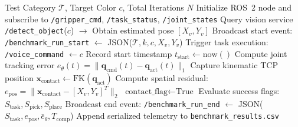 \documentclass[runningheads]{llncs}
\begin{document}
\begin{algorithm}[tb]
\caption{Automated Benchmark Execution and Telemetry Logging}
\label{alg:benchmark_workflow}
\begin{algorithmic}[1]
\REQUIRE Test Category $\mathcal{T}$, Target Color $c$, Total Iterations $N$
\STATE Initialize ROS~2 node and subscribe to \texttt{/gripper\_cmd}, \texttt{/task\_status}, \texttt{/joint\_states}
    \STATE Query vision service \texttt{/detect\_object}($c$) $\to$ Obtain estimated pose $[X_v, Y_v]$
    \STATE Broadcast start event: \texttt{/benchmark\_run\_start} $\leftarrow$ JSON($\mathcal{T}, k, c, X_v, Y_v$)
    \STATE Trigger task execution: \texttt{/voice\_command} $\leftarrow c$
    \STATE Record start timestamp $t_{\text{start}} \leftarrow \text{now}()$
        \STATE Compute joint tracking error $e_\theta(t) = \|\mathbf{q}_{\text{cmd}}(t) - \mathbf{q}_{\text{act}}(t)\|_1$
            \STATE Capture kinematic TCP position $\mathbf{x}_{\text{contact}} \leftarrow \text{FK}(\mathbf{q}_{\text{act}})$
            \STATE Compute spatial residual: $e_{\text{pos}} = \|\mathbf{x}_{\text{contact}} - [X_v, Y_v]^T\|_2$
            \STATE $\text{contact\_flag} \leftarrow \text{True}$
        \ENDIF
    \ENDWHILE
    \STATE Evaluate success flags: $S_{\text{task}}, S_{\text{pick}}, S_{\text{place}}$
    \STATE Broadcast end event: \texttt{/benchmark\_run\_end} $\leftarrow$ JSON($S_{\text{task}}, e_{\text{pos}}, \bar{e}_\theta, T_{\text{comp}}$)
    \STATE Append serialized telemetry to \texttt{benchmark\_results.csv}
\ENDFOR
\end{algorithmic}
\end{algorithm}
\end{document}
